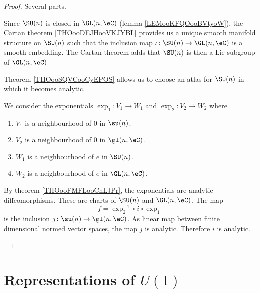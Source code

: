\begin{proof}
	Several parts.
	\begin{subproof}
		Since \( \SU(n)\) is closed in \( \GL(n,\eC)\) (lemma \ref{LEMooKFQOooBVtyoW}), the Cartan theorem \ref{THOooDEJHooVKJYBL} provides us a unique smooth manifold structure on \( \SU(n)\) such that the inclusion map \( \iota\colon \SU(n)\to \GL(n,\eC)\) is a smooth embedding. The Cartan theorem adds that \( \SU(n)\) is then a Lie subgroup of \( \GL(n,\eC)\)

		Theorem \ref{THOooSQVCooCyEPOS} allows us to choose an atlas for \( \SU(n)\) in which it becomes analytic.

		We consider the exponentials \(\exp_1 \colon V_1\to W_1  \) and \(\exp_2 \colon V_2\to W_2  \) where
		\begin{enumerate}
			\item
			      \( V_1\) is a neighbourhood of \( 0\) in \( \su(n)\).
			\item
			      \( V_2\) is a neighbourhood of \( 0\) in \( \gl(n,\eC)\).
			\item
			      \( W_1\) is a neighbourhood of \( e\) in \( \SU(n)\).
			\item
			      \( W_2\) is a neighbourhood of \( e\) in \( \GL(n,\eC)\).
		\end{enumerate}
		By theorem \ref{THOooFMFLooCnLJPr}, the exponentials are analytic diffeomorphisms. These are charts of \( \SU(n)\) and \( \GL(n,\eC)\). The map
		\begin{equation}
			f=\exp_2^{-1}\circ i\circ \exp_1
		\end{equation}
		is the inclusion \(j \colon \su(n)\to \gl(n,\eC)  \). As linear map between finite dimensional normed vector spaces, the map \( j\) is analytic. Therefore \( i\) is analytic.
	\end{subproof}
\end{proof}

\section{Representations of \texorpdfstring{$ U(1)$}{U(1)}}

